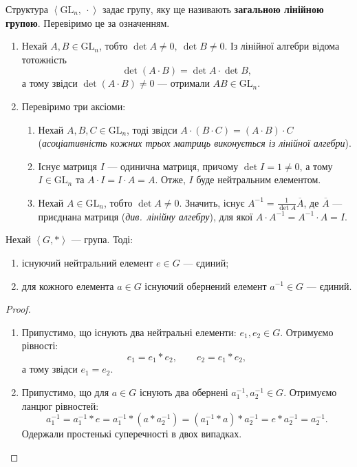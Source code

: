 \documentclass{math_library}
\begin{document}
\begin{example}
Структура $\left< \mathrm{GL}_n,\ \cdot \right>$ задає групу, яку ще називають \textbf{загальною лінійною групою}. Перевіримо це за означенням.

\begin{enumerate}[wide=0pt,label={\Roman*)}]
\item Нехай $A,B \in \mathrm{GL}_n$, тобто $\det A \neq 0,\ \det B \neq 0$. Із лінійної алгебри відома тотожність \[
\det (A \cdot B) = \det A \cdot \det B,
\] а тому звідси $\det (A \cdot B) \neq 0$ --- отримали $AB \in \mathrm{GL}_n$.

\item Перевіримо три аксіоми:
\begin{enumerate}[nosep,label={\arabic*)}]
\item Нехай $A,B,C \in \mathrm{GL}_n$, тоді звідси $A \cdot (B \cdot C) = (A \cdot B) \cdot C$ (\textit{асоціативність кожних трьох матриць виконується із лінійної алгебри}).
\item Існує матриця $I$ --- одинична матриця, причому $\det I = 1 \neq 0$, а тому $I \in \mathrm{GL}_n$ та $A \cdot I = I \cdot A = A$. Отже, $I$ буде нейтральним елементом.
\item Нехай $A \in \mathrm{GL}_n$, тобто $\det A \neq 0$. Значить, існує $A^{-1} = \frac{1}{\det A} \overline{A}$, де $\overline{A}$ --- приєднана матриця (\textit{див.~лінійну алгебру}), для якої $A \cdot A^{-1} = A^{-1} \cdot A = I$.
\end{enumerate}
\end{enumerate}
\end{example}

\begin{proposition}
Нехай $\left<G,* \right>$ --- група. Тоді:
\begin{enumerate}[nosep,wide=0pt, label={\arabic*)}]
\item існуючий нейтральний елемент $e \in G$ --- єдиний;
\item для кожного елемента $a \in G$ існуючий обернений елемент $a^{-1} \in G$ --- єдиний.
\end{enumerate}
\end{proposition}

\begin{proof}
\begin{enumerate}[topsep=0pt,wide=0pt,label={\arabic*)}]
\item Припустимо, що існують два нейтральні елементи: $e_1,e_2 \in G$. Отримуємо рівності: \[
e_1 = e_1*e_2, \qquad e_2 = e_1*e_2,
\] а тому звідси $e_1 = e_2$.

\item Припустимо, що для $a \in G$ існують два обернені $a_1^{-1},a_2^{-1} \in G$. Отримуємо ланцюг рівностей:
\[
a_1^{-1} = a_1^{-1} * e = a_1^{-1} * (a*a_2^{-1}) = (a_1^{-1}*a)*a_2^{-1} = e*a_2^{-1} = a_2^{-1}. \]
Одержали простенькі суперечності в двох випадках. \qedhere
\end{enumerate}
\end{proof}
\end{document}

